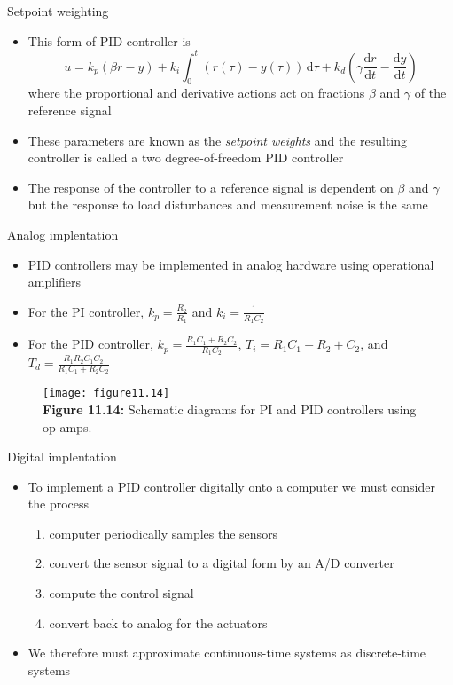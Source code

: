 \documentclass{beamer-control}
\begin{document}
\begin{frame}{Setpoint weighting}
\begin{itemize}
	\item This form of PID controller is 
	\[u=k_p(\beta r - y) + k_i \int^t_0 \left( r(\tau)-y(\tau) \right) \, \mathrm{d} \tau + k_d\left(\gamma \frac{\mathrm{d}r}{\mathrm{d} t} -\frac{\mathrm{d}y}{\mathrm{d} t}\right)\]
	where the proportional and derivative actions act on fractions $\beta$ and $\gamma$ of the reference signal
	\item These parameters are known as the \textit{setpoint weights} and the resulting controller is called a two degree-of-freedom PID controller
	\item The response of the controller to a reference signal is dependent on $\beta$ and $\gamma$ but the response to load disturbances and measurement noise is the same
\end{itemize}
\end{frame}



\begin{frame}{Analog implentation}
	\begin{itemize}
		\item PID controllers may be implemented in analog hardware using operational amplifiers 
		\item For the PI controller, $k_p=\tfrac{R_2}{R_1} $ and $k_i = \tfrac{1}{R_1C_2}$
		\item For the PID controller, $k_p = \tfrac{R_1C_1+R_2C_2}{R_1C_2}$, $T_i = R_1C_1+R_2+C_2$, and $T_d=\tfrac{R_1R_2C_1C_2}{R_1C_1+R_2C_2}$
	\end{itemize}
\begin{figure}
	\centering
	\texttt{[image: figure11.14]}
	\\
	\textbf{Figure 11.14:} Schematic diagrams for PI and PID controllers using op amps. 
\end{figure}
\end{frame}

\begin{frame}{Digital implentation}
\begin{itemize}
\item To implement a PID controller digitally onto a computer we must consider the process
\begin{enumerate}
	\item computer periodically samples the sensors
	\item convert the sensor signal to a digital form by an A/D converter
	\item compute the control signal 
	\item convert back to analog for the actuators
\end{enumerate} 
\item We therefore must approximate continuous-time systems as discrete-time systems
\end{itemize}
\end{frame}
\end{document}

